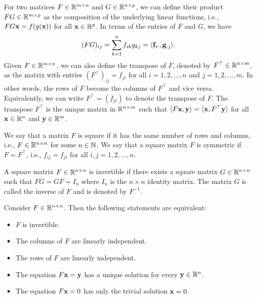 For two matrices $F \in \mathbb{R}^{m \times n}$ and $G \in \mathbb{R}^{n \times p}$, we can define their product $FG \in \mathbb{R}^{m \times p}$ as the composition of the underlying linear functions, i.e., $FG \mathbf{x} = f(g(\mathbf{x}))$ for all $\mathbf{x} \in \mathbb{R}^p$. In terms of the entries of $F$ and $G$, we have
\begin{equation*}
    (FG)_{ij} = \sum_{k=1}^n f_{ik} g_{kj} = \langle \mathbf{f}_{i:}, \mathbf{g}_{:j} \rangle.
\end{equation*}
Given $F \in \mathbb{R}^{m \times n}$, we can also define the transpose of $F$, denoted by $F^\top \in \mathbb{R}^{n \times m}$, as the matrix with entries $(F^\top)_{ij} = f_{ji}$ for all $i=1,2,\ldots,n$ and $j=1,2,\ldots,m$. In other words, the rows of $F$ become the columns of $F^\top$ and vice versa. Equivalently, we can write $F^\top = (f_{ji})$ to denote the transpose of $F$. The transpose $F^\top$ is the unique matrix in $\mathbb{R}^{n \times m}$ such that $\langle F \mathbf{x}, \mathbf{y} \rangle = \langle \mathbf{x}, F^\top \mathbf{y} \rangle$ for all $\mathbf{x} \in \mathbb{R}^n$ and $\mathbf{y} \in \mathbb{R}^m$.

\begin{definition}
    We say that a matrix $F$ is square if it has the same number of rows and columns, i.e., $F \in \mathbb{R}^{n \times n}$ for some $n \in \mathbb{N}$. We say that a square matrix $F$ is 
    symmetric if $F = F^\top$, i.e., $f_{ij} = f_{ji}$ for all $i,j=1,2,\ldots,n$.
\end{definition}

\begin{definition}
    A square matrix $F \in \mathbb{R}^{n \times n}$ is invertible if there exists a square matrix $G \in \mathbb{R}^{n \times n}$ such that $FG = GF = I_n$ where $I_n$ is the $n \times n$ identity matrix. The matrix $G$ is called the inverse of $F$ and is denoted by $F^{-1}$.
\end{definition}

\begin{lemma}
    Consider $F \in \mathbb{R}^{n \times n}$. Then the following statements are equivalent:

    \begin{itemize}
        \item $F$ is invertible.
        \item The columns of $F$ are linearly independent.
        \item The rows of $F$ are linearly independent.
        \item The equation $F \mathbf{x} = \mathbf{y}$ has a unique solution for every $\mathbf{y} \in \mathbb{R}^n$.
        \item The equation $F \mathbf{x} = 0$ has only the trivial solution $\mathbf{x} = 0$.
    \end{itemize}
\end{lemma}

